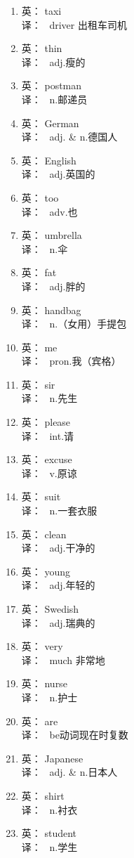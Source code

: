 {\begin{multicols}{2}
\begin{enumerate}
\item 英： taxi \\ 译： \ driver 出租车司机
\item 英： thin \\ 译： \ adj.瘦的
\item 英： postman \\ 译： \ n.邮递员
\item 英： German \\ 译： \ adj. \& n.德国人
\item 英： English \\ 译： \ adj.英国的
\item 英： too \\ 译： \ adv.也
\item 英： umbrella \\ 译： \ n.伞
\item 英： fat \\ 译： \ adj.胖的
\item 英： handbag \\ 译： \ n.（女用）手提包
\item 英： me \\ 译： \ pron.我（宾格）
\item 英： sir \\ 译： \ n.先生
\item 英： please \\ 译： \ int.请
\item 英： excuse \\ 译： \ v.原谅
\item 英： suit \\ 译： \ n.一套衣服
\item 英： clean \\ 译： \ adj.干净的
\item 英： young \\ 译： \ adj.年轻的
\item 英： Swedish \\ 译： \ adj.瑞典的
\item 英： very \\ 译： \ much 非常地
\item 英： nurse \\ 译： \ n.护士
\item 英： are \\ 译： \ be动词现在时复数
\item 英： Japanese \\ 译： \ adj. \& n.日本人
\item 英： shirt \\ 译： \ n.衬衣
\item 英： student \\ 译： \ n.学生

\end{enumerate}
\end{multicols}}
